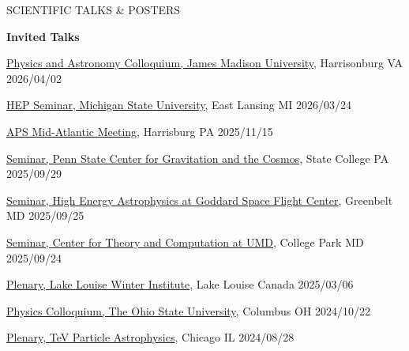 \documentclass{resume} %
\begin{document}
\begin{rSection}{SCIENTIFIC TALKS \& POSTERS}

{\bf Invited Talks}
\begin{etaremune}
\setlength\itemsep{-0.5em}

\item \href{https://www.jmu.edu/physics/seminar.shtml}{Physics and Astronomy Colloquium, James Madison University}, Harrisonburg VA  \hfill 2026/04/02

\item \href{https://pa.msu.edu/_assets/_files/abstracts-seminars/2026-spring/Clark-Title-Abstract-HEpseminar-3242026.pdf}{HEP Seminar, Michigan State University}, East Lansing MI  \hfill 2026/03/24

\item \href{https://meetings.aps.org/Meeting/MAS25/Session/C05.6}{APS Mid-Atlantic Meeting}, Harrisburg PA  \hfill 2025/11/15

\item \href{https://sites.psu.edu/pgsa/calendar_event/gapp-seminar-brian-clark-chasing-the-ghost-particle-neutrino-astrophysics-with-icecube/}{Seminar, Penn State Center for Gravitation and the Cosmos}, State College PA  \hfill 2025/09/29

\item \href{https://indico.global/event/483/contributions/120341/}{Seminar, High Energy Astrophysics at Goddard Space Flight Center}, Greenbelt MD  \hfill 2025/09/25

\item \href{https://www.astro.umd.edu/news-events/events/ctc-seminar-brian-clark-umd-physics-chasing-ghost-particle-neutrino-astrophysics}{Seminar, Center for Theory and Computation at UMD}, College Park MD  \hfill 2025/09/24

\item \href{https://indico.global/event/483/contributions/120341/}{Plenary, Lake Louise Winter Institute}, Lake Louise Canada  \hfill 2025/03/06

\item \href{https://physics.osu.edu/events/colloquium-brian-clark-university-maryland-chasing-ghost-particle-neutrino-astrophysics}{Physics Colloquium, The Ohio State University}, Columbus OH  \hfill 2024/10/22

\item \href{https://indico.uchicago.edu/event/427/contributions/1531/}{Plenary, TeV Particle Astrophysics}, Chicago IL  \hfill 2024/08/28


\end{etaremune}
\end{rSection}
\end{document}
